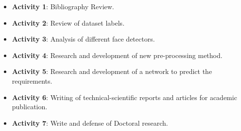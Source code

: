 \begin{itemize}
\item \textbf{Activity 1}: Bibliography Review.
\item \textbf{Activity 2}: Review of dataset labels.
\item \textbf{Activity 3}: Analysis of different face detectors.
\item \textbf{Activity 4}: Research and development of new pre-processing method.
\item \textbf{Activity 5}: Research and development of a network to predict the \eyecenterlocation requirements.
\item \textbf{Activity 6}: Writing of technical-scientific reports and articles for academic publication.
\item \textbf{Activity 7}: Write and defense of Doctoral research.
\end{itemize}
